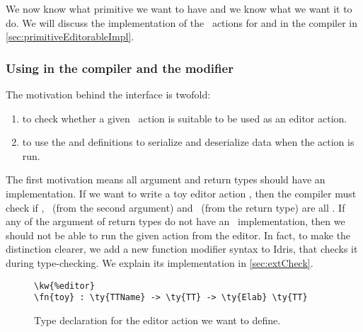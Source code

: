 We now know what primitive we want to have and we know what we want it to do.
We will discuss the implementation of the \Elab\ actions for 
and  in the compiler in \autoref{sec:primitiveEditorableImpl}.

\subsubsection{Using  in the compiler and the  modifier}\label{ssec:usingEditorable}

The motivation behind the  interface is twofold:
\begin{enumerate}
\item to check whether a given \Elab\ action is suitable to be used as an
  editor action.
\item to use the  and  definitions to serialize
  and deserialize data when the action is run.
\end{enumerate}


The first motivation means all argument and return types should have an
 implementation. If we want to write a toy editor action
,
then the compiler must check if , \TT\ (from the second argument)
and \TT\ (from the return type) are all \Editorable. If any of the argument of
return types do not have an \Editorable\ implementation, then we should not be
able to run the given action from the editor. In fact, to make the distinction
clearer, we add a new function modifier syntax  to Idris, that
checks it during type-checking.  We explain its implementation in
\autoref{sec:extCheck}.

\begin{figure}[H]
\begin{Verbatim}[framesep=2mm, label=\footnotesize{\normalfont{Idris}}, labelposition=topline]
\kw{%editor}
\fn{toy} : \ty{TTName} -> \ty{TT} -> \ty{Elab} \ty{TT}
\end{Verbatim}
\caption{Type declaration for the  editor action we want to define.}
\end{figure}

